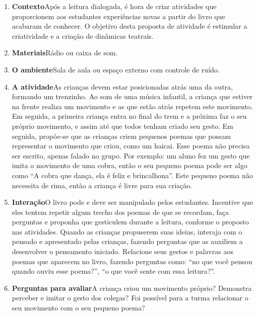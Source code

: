 \documentclass[11pt]{extarticle}
\begin{document}


\begin{enumerate}
\item \textbf{Contexto}\quad Após a leitura dialogada, é hora de criar 
atividades que proporcionem aos estudantes experiências novas a partir do livro
que acabaram de conhecer.
O objetivo desta proposta de atividade é estimular a criatividade e a criação de dinâmicas teatrais.

\item \textbf{Materiais}\quad Rádio ou caixa de som.

\item \textbf{O ambiente}\quad Sala de aula ou espaço externo com controle de ruído.

\item \textbf{A atividade}\quad As crianças devem estar posicionadas atrás uma da outra, formando um trenzinho. Ao som de uma música infantil, a criança que estiver na frente realiza um movimento e as que estão atrás repetem este movimento. Em seguida, a primeira criança entra no final do trem e a próxima faz o seu próprio movimento, e assim até que todos tenham criado seu gesto. Em seguida, propõe-se que as crianças criem pequenos poemas que possam representar o movimento que criou, como um haicai. Esse poema não precisa ser escrito, apenas falado no grupo. Por exemplo: um aluno fez um gesto que imita o movimento de uma cobra, então o seu pequeno poema pode ser algo como ``A cobra que dança, ela é feliz e brincalhona''. Este pequeno poema não necessita de rima, então a criança é livre para sua criação. 

\item \textbf{Interação}\quad O livro pode e deve ser 
manipulado pelos estudantes. Incentive que eles tentem repetir algum trecho dos poemas de que se recordam,
faça perguntas e proponha que gesticulem durante a leitura, conforme o proposto nas atividades. Quando as crianças propuserem suas ideias, interaja com o pensado e apresentado pelas crianças, fazendo perguntas que as auxiliem a desenvolver o pensamento iniciado.
Relacione seus gestos e palavras aos poemas que aparecem no livro, fazendo perguntas como: ``no que você pensou quando ouviu esse poema?'', ``o que você sente com essa leitura?''.

\item \textbf{Perguntas para avaliar}\quad A criança criou um movimento próprio? Demonstra perceber e imitar o gesto dos colegas? Foi possível para a turma relacionar o seu movimento com o seu pequeno poema?
\end{enumerate}
\end{document}
